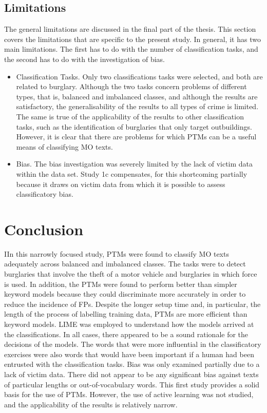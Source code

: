 \subsection{Limitations} The general limitations are discussed in the final part of the thesis. This section covers the limitations that are specific to the present study. In general, it has two main limitations. The first has to do with the number of classification tasks, and the second has to do with the investigation of bias.

\begin{itemize}
    \item Classification Tasks. Only two classifications tasks were selected, and both are related to burglary. Although the two tasks concern problems of different types, that is, balanced and imbalanced classes, and although the results are satisfactory, the generalisability of the results to all types of crime is limited. The same is true of the applicability of the results to other classification tasks, such as the identification of burglaries that only target outbuildings. However, it is clear that there are problems for which PTMs can be a useful means of classifying MO texts.
    
    \item Bias. The bias investigation was severely limited by the lack of victim data within the data set. Study 1c compensates, for this shortcoming partially because it draws on victim data from which it is possible to assess classificatory bias.
    
\end{itemize}

\section{Conclusion} IIn this narrowly focused study, PTMs were found to classify MO texts adequately across balanced and imbalanced classes. The tasks were to detect burglaries that involve the theft of a motor vehicle and burglaries in which force is used. In addition, the PTMs were found to perform better than simpler keyword models because they could discriminate more accurately in order to reduce the incidence of FPs. Despite the longer setup time and, in particular, the length of the process of labelling training data, PTMs are more efficient than keyword models. LIME was employed to understand how the models arrived at the classifications. In all cases, there appeared to be a sound rationale for the decisions of the models. The words that were more influential in the classificatory exercises were also words that would have been important if a human had been entrusted with the classification tasks. Bias was only examined partially due to a lack of victim data. There did not appear to be any significant bias against texts of particular lengths or out-of-vocabulary words. This first study provides a solid basis for the use of PTMs. However, the use of active learning was not studied, and the applicability of the results is relatively narrow.

